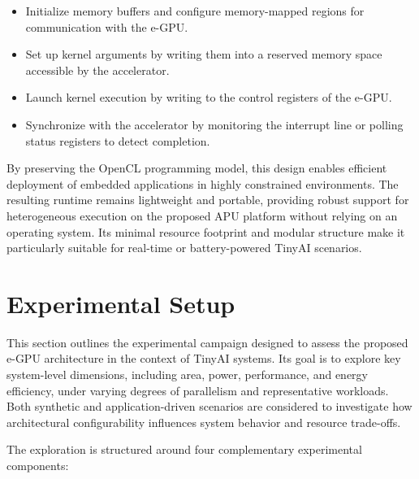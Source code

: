             \vspace{-1em}
            \begin{itemize}
                \item Initialize memory buffers and configure memory-mapped regions for communication with the \mbox{e-GPU}. 
                
                \item Set up kernel arguments by writing them into a reserved memory space accessible by the accelerator.
                
                \item Launch kernel execution by writing to the control registers of the \mbox{e-GPU}.
                
                \item Synchronize with the accelerator by monitoring the interrupt line or polling status registers to detect completion.
            \end{itemize}
            \vspace{-1em}
            
            By preserving the OpenCL programming model, this design enables efficient deployment of embedded applications in highly constrained environments. The resulting runtime remains lightweight and portable, providing robust support for heterogeneous execution on the proposed APU platform without relying on an operating system. Its minimal resource footprint and modular structure make it particularly suitable for real-time or battery-powered TinyAI scenarios.

    \section{Experimental Setup}
    \label{sec:experimental_setup}
    
        This section outlines the experimental campaign designed to assess the proposed \mbox{e-GPU} architecture in the context of TinyAI systems. Its goal is to explore key system-level dimensions, including area, power, performance, and energy efficiency, under varying degrees of parallelism and representative workloads. Both synthetic and application-driven scenarios are considered to investigate how architectural configurability influences system behavior and resource trade-offs.
        
        The exploration is structured around four complementary experimental components:
        
